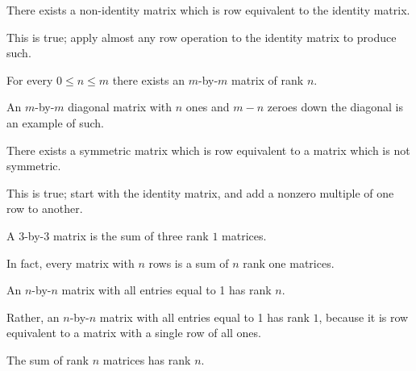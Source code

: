 \documentclass{homework}
\begin{document}
\begin{problem}
  There exists a non-identity matrix which is row equivalent to the identity
  matrix.
\end{problem}

\begin{solution}
  This is true; apply almost any row operation to the identity matrix
  to produce such.
\end{solution}

\begin{problem}
  For every $0 \leq n \leq m$ there exists an $m$-by-$m$ matrix of rank $n$.
\end{problem}

\begin{solution}
  An $m$-by-$m$ diagonal matrix with $n$ ones and $m-n$ zeroes down
  the diagonal is an example of such.
\end{solution}

\begin{problem}
  There exists a symmetric matrix which is row equivalent to a matrix which
  is not symmetric.
\end{problem}

\begin{solution}
  This is true; start with the identity matrix, and add a nonzero
  multiple of one row to another.
\end{solution}

\begin{problem}
  A $3$-by-$3$ matrix is the sum of three rank $1$ matrices.
\end{problem}

\begin{solution}
  In fact, every matrix with $n$ rows is a sum of $n$ rank one
  matrices.
\end{solution}

\begin{problem}
  An $n$-by-$n$ matrix with all entries equal to 1 has rank $n$.
\end{problem}

\begin{solution}
  Rather, an $n$-by-$n$ matrix with all entries equal to 1 has rank
  $1$, because it is row equivalent to a matrix with a single row of
  all ones.
\end{solution}

\begin{problem}
  The sum of rank $n$ matrices has rank $n$.
\end{problem}
\end{document}
